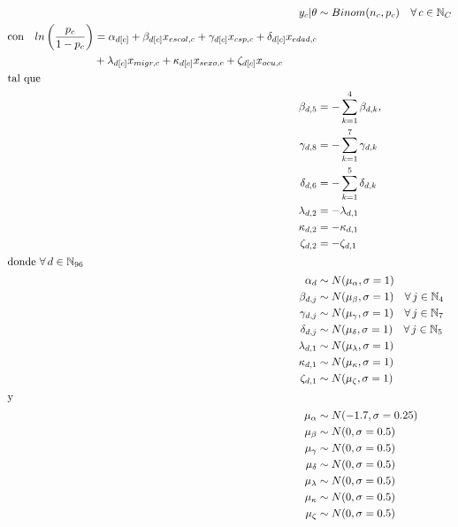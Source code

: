 \begin{align}\label{eq:Modelo_Comp_EF}
y_c|\theta & \sim Binom(n_c,p_c) \quad \forall \, c \in \mathbb{N}_C \nonumber \\
\begin{split}
\text{con} \quad ln\left(\dfrac{p_c}{1-p_c}\right) &= \alpha_{d[c]} + \beta_{d[c]} x_{escol,c} + \gamma_{d[c]} x_{csp,c} + \delta_{d[c]} x_{edad,c} \\
&+ \lambda_{d[c]} x_{migr,c} + \kappa_{d[c]} x_{sexo,c} + \zeta_{d[c]} x_{ocu,c} 
\end{split}\\
\intertext{tal que} 
\beta_{d,5} &= -\sum\limits_{k = 1}^{4} \beta_{d,k}, \nonumber \\
\gamma_{d,8} &= -\sum\limits_{k = 1}^{7} \gamma_{d,k} \nonumber \\
\delta_{d,6} &= -\sum\limits_{k = 1}^{5} \delta_{d,k} \nonumber \\
\lambda_{d,2} &= -\lambda_{d,1} \nonumber \\
\kappa_{d,2} &= -\kappa_{d,1} \nonumber \\
\zeta_{d,2} &= -\zeta_{d,1} \nonumber \\
\intertext{donde $\forall \, d \in \mathbb{N}_{96}$}
\alpha_d &\sim N(\mu_{\alpha}, \sigma=1) \quad  \nonumber \\
\beta_{d,j} &\sim N(\mu_{\beta}, \sigma=1) \quad \forall \, j \in \mathbb{N}_{4} \nonumber \\
\gamma_{d,j} &\sim N(\mu_{\gamma}, \sigma=1) \quad \forall \, j \in \mathbb{N}_{7} \nonumber \\
\delta_{d,j} &\sim N(\mu_{\delta}, \sigma=1) \quad \forall \, j \in \mathbb{N}_{5}  \nonumber \\ 
\lambda_{d,1} &\sim N(\mu_{\lambda}, \sigma=1) \nonumber \\
\kappa_{d,1} &\sim N(\mu_{\kappa}, \sigma=1) \nonumber \\ 
\zeta_{d,1} &\sim N(\mu_{\zeta}, \sigma=1) \nonumber \\
\intertext{y}
\mu_{\alpha} &\sim N(-1.7,\sigma=0.25) \nonumber \\
\mu_{\beta} &\sim N(0,\sigma=0.5) \nonumber \\
\mu_{\gamma} &\sim N(0,\sigma=0.5) \nonumber \\
\mu_{\delta} &\sim N(0,\sigma=0.5) \nonumber \\
\mu_{\lambda} &\sim N(0,\sigma=0.5) \nonumber \\
\mu_{\kappa} &\sim N(0,\sigma=0.5) \nonumber \\
\mu_{\zeta} &\sim N(0,\sigma=0.5) \nonumber
\end{align}


